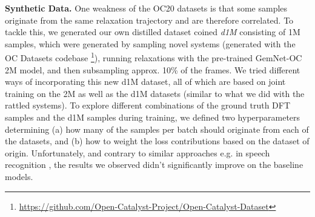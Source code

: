 \documentclass{article}
\begin{document}
\textbf{Synthetic Data.}
One weakness of the OC20 datasets is that some samples originate from the same relaxation trajectory and are therefore correlated. %
To tackle this, %
we generated our own distilled dataset coined \textit{d1M} consisting of 1M samples, which were generated by sampling novel systems (generated with the OC Datasets codebase \footnote{\url{https://github.com/Open-Catalyst-Project/Open-Catalyst-Dataset}}), running relaxations with the pre-trained GemNet-OC 2M model, and then subsampling approx. 10\% of the frames.
We tried different ways of incorporating this new d1M dataset, all of which are based on joint training on the 2M as well as the d1M datasets (similar to what we did with the rattled systems). 
To explore different combinations of the ground truth DFT samples and the d1M samples during training, we defined two hyperparameters determining (a) how many of the samples per batch should originate from each of the datasets, and (b) how to weight the loss contributions based on the dataset of origin. Unfortunately, and contrary to similar approaches e.g. in speech recognition \cite{zhang2020pushing}, the results we observed didn't significantly improve on the baseline models. 
\end{document}
